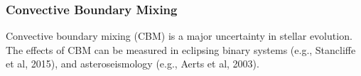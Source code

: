 {\color{purple}
\subsubsection{Convective Boundary Mixing}
}

Convective boundary mixing (CBM) is a major uncertainty in stellar evolution. The effects of CBM can be measured in eclipsing binary systems (e.g., Stancliffe et al, 2015), and asteroseismology (e.g., Aerts et al, 2003).

